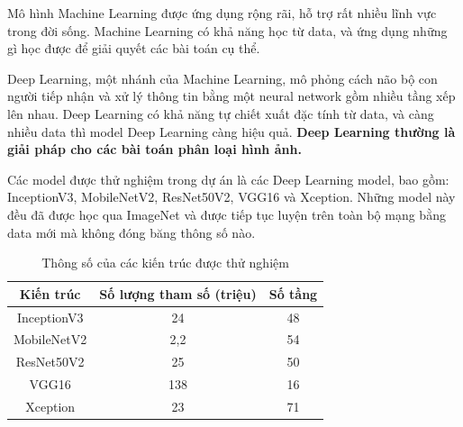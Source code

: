 \documentclass{beamer}
\begin{document}
\begin{frame}[allowframebreaks]{Mô hình}
	Machine Learning được ứng dụng rộng rãi, hỗ trợ rất nhiều lĩnh vực trong đời sống. Machine Learning có khả năng học từ data, và ứng dụng những gì học được để giải quyết các bài toán cụ thể.

	\framebreak

	Deep Learning, một nhánh của Machine Learning, mô phỏng cách não bộ con người tiếp nhận và xử lý thông tin bằng một neural network gồm nhiều tầng xếp lên nhau. Deep Learning có khả năng tự chiết xuất đặc tính từ data, và càng nhiều data thì model Deep Learning càng hiệu quả. \textbf{Deep Learning thường là giải pháp cho các bài toán phân loại hình ảnh.}

	\framebreak

	Các model được thử nghiệm trong dự án là các Deep Learning model, bao gồm: InceptionV3, MobileNetV2, ResNet50V2, VGG16 và Xception. Những model này đều đã được học qua ImageNet và được tiếp tục luyện trên toàn bộ mạng bằng data mới mà không đóng băng thông số nào.

	\framebreak

	\begin{table}[H]
		\centering
		\begin{tabular}{|c|c|c|}
		\hline
		Kiến trúc   & Số lượng tham số (triệu) & Số tầng \\ \hline
		InceptionV3 & 24                       & 48      \\
		MobileNetV2 & 2,2                      & 54      \\
		ResNet50V2  & 25                       & 50      \\
		VGG16       & 138                      & 16      \\
		Xception    & 23                       & 71      \\ \hline
		\end{tabular}

		\caption{Thông số của các kiến trúc được thử nghiệm}
	\end{table}


\end{frame}
\end{document}
